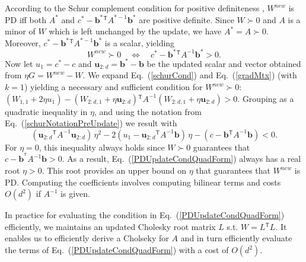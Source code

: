 \documentclass[twoside,11pt]{article}
\newcommand\mat[1]{{#1}}
\renewcommand\vec[1]{\mathbf{#1}}
\newcommand{\T}{{}^\mathsf{T}}
\newcommand{\W}{\mat{W}}
\newcommand{\newW}{{\mat{W^{new}}}}
\newcommand{\cholL}{\mat{L}}
\newcommand{\A}{\mat{A}}
\newcommand{\B}{\vec{b}}
\newcommand{\C}{c}
\newcommand{\invA}{A^{-1}}
\newcommand{\uscalar}{{u}_{1}}
\newcommand{\uvec}{\vec{u}_{2:d}}
\newcommand{\Wvec}{\W_{2:d,1}}
\newcommand{\Wscalar}{\W_{1,1}}
\renewcommand{\eqref}[1]{Eq.~(\ref{#1})}
\begin{document}
According to the Schur complement condition for positive definiteness
\citep[p. 650]{boyd2004convex}, $\newW$ is PD iff both
$A^*$ and $\C^* - \B^*\T A^{*-1} \B^*$ are positive definite.
Since $W \succ 0$ and $A$ is a minor of $\W$ which is left unchanged by the update, we have $A^* =
A \succ 0$. Moreover, $\C^* - \B^*\T A^{*-1} \B^*$ is a
scalar, yielding
\begin{equation}
  \newW \succ  0 \quad \Leftrightarrow \quad  \C^* - \B^*\T \invA \B^* >  0.
  \label{schurCond}
\end{equation}
Now let $\uscalar = \C^* - \C$ and $\uvec = \B^* - \B$ be the updated scalar and vector
obtained from $\eta G = \newW - \W$. We expand \eqref{schurCond} and
\eqref{gradMtx} (with $k=1$) yielding a necessary and sufficient condition for $\newW \succ 0$: $(\Wscalar + 2\eta \uscalar)-(\Wvec + \eta \uvec)\T \invA (\Wvec + \eta \uvec)   > 0$.
Grouping as a quadratic inequality in $\eta$, and using the notation from \eqref{schurNotationPreUpdate} we result with
\begin{equation}
\label{PDUpdateCondQuadForm}
(\uvec\T \invA \uvec) \, \eta^2 
-2(\uscalar - \uvec\T \invA \B) \,\eta 
-(\C - \B\T  \invA \B) < 0 .
\end{equation}
For $\eta = 0$, this inequality always
holds since $\W \succ 0$ guarantees that $\C-\B^{\T} \invA \B >0$. As a result,
 \eqref{PDUpdateCondQuadForm} always has a real
root $\eta > 0$. This root provides an upper bound on $\eta$ that guarantees that $\newW$ is PD. Computing the coefficients involves computing bilinear terms and costs $O(d^2)$ if $\invA$ is given.



In practice for evaluating the condition in \eqref{PDUpdateCondQuadForm} efficiently, we maintains an updated Cholesky root matrix $\cholL$ s.t. $\W = \cholL\T \cholL$. It enables us to efficiently derive a Cholseky for $\A$ \citep{Davis05rowchol} and in turn efficiently evaluate the terms of \eqref{PDUpdateCondQuadForm} with a cost of $O(d^2)$. 
\end{document}
